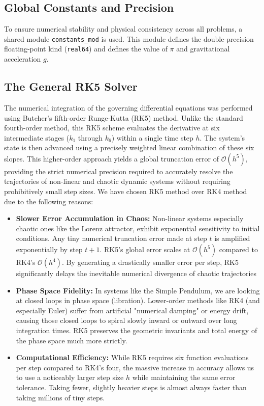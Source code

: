 \documentclass[12pt, a4paper, twoside]{article}
\begin{document}
        \subsection{Global Constants and Precision}
        To ensure numerical stability and physical consistency across all problems, a shared module \texttt{constants\_mod} is used. This module defines the double-precision floating-point kind (\texttt{real64}) and defines the value of $\pi$ and gravitational acceleration $g$.
        

        \subsection{The General RK5 Solver}
        The numerical integration of the governing differential equations was performed using Butcher's fifth-order Runge-Kutta (RK5) method. Unlike the standard fourth-order method, this RK5 scheme evaluates the derivative at six intermediate stages ($k_1$ through $k_6$) within a single time step $h$. The system's state is then advanced using a precisely weighted linear combination of these six slopes. This higher-order approach yields a global truncation error of $\mathcal{O}(h^5)$, providing the strict numerical precision required to accurately resolve the trajectories of non-linear and chaotic dynamic systems without requiring prohibitively small step sizes.
         \vspace{0.5cm}
        We have chosen RK5 method over RK4 method due to the following reasons:
        \begin{itemize}
            \item {\bf Slower Error Accumulation in Chaos:} Non-linear systems especially chaotic ones like the Lorenz attractor, exhibit exponential sensitivity to initial conditions. Any tiny numerical truncation error made at step $t$ is amplified exponentially by step $t+1$. RK5's global error scales at $\mathcal{O}(h^5)$ compared to RK4's $\mathcal{O}(h^4)$. By generating a drastically smaller error per step, RK5 significantly delays the inevitable numerical divergence of chaotic trajectories
            \item {\bf Phase Space Fidelity:} In systems like the Simple Pendulum, we are looking at closed loops in phase space (libration). Lower-order methods like RK4 (and especially Euler) suffer from artificial "numerical damping" or energy drift, causing those closed loops to spiral slowly inward or outward over long integration times. RK5 preserves the geometric invariants and total energy of the phase space much more strictly.
            \item {\bf Computational Efficiency:} While RK5 requires six function evaluations per step compared to RK4's four, the massive increase in accuracy allows us to use a noticeably larger step size $h$ while maintaining the same error tolerance. Taking fewer, slightly heavier steps is almost always faster than taking millions of tiny steps.
        \end{itemize}
\end{document}
